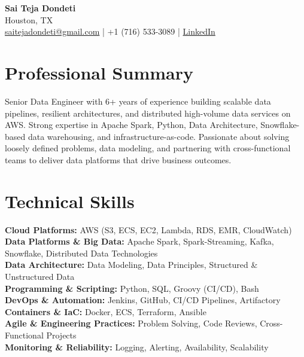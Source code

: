 \documentclass[10pt]{article} %
\begin{document}
\begin{center}
    {\LARGE \textbf{Sai Teja Dondeti}} \\
    \vspace{2pt}
    Houston, TX \\
    \href{mailto:saitejadondeti@gmail.com}{saitejadondeti@gmail.com} \;|\;
    +1 (716) 533-3089 \;|\; %
    \href{https://www.linkedin.com/in/sai-teja-dondeti/}{LinkedIn}
\end{center}

\section*{Professional Summary}
Senior Data Engineer with 6+ years of experience building scalable data pipelines, resilient architectures, and distributed high-volume data services on AWS. %
Strong expertise in Apache Spark, Python, Data Architecture, Snowflake-based data warehousing, and infrastructure-as-code. %
Passionate about solving loosely defined problems, data modeling, and partnering with cross-functional teams to deliver data platforms that drive business outcomes. %

\section*{Technical Skills}

\textbf{Cloud Platforms:} AWS (S3, ECS, EC2, Lambda, RDS, EMR, CloudWatch) \\
\textbf{Data Platforms \& Big Data:} Apache Spark, Spark-Streaming, Kafka, Snowflake, Distributed Data Technologies \\
\textbf{Data Architecture:} Data Modeling, Data Principles, Structured \& Unstructured Data \\
\textbf{Programming \& Scripting:} Python, SQL, Groovy (CI/CD), Bash \\
\textbf{DevOps \& Automation:} Jenkins, GitHub, CI/CD Pipelines, Artifactory \\
\textbf{Containers \& IaC:} Docker, ECS, Terraform, Ansible \\
\textbf{Agile \& Engineering Practices:} Problem Solving, Code Reviews, Cross-Functional Projects \\
\textbf{Monitoring \& Reliability:} Logging, Alerting, Availability, Scalability 
\end{document}
